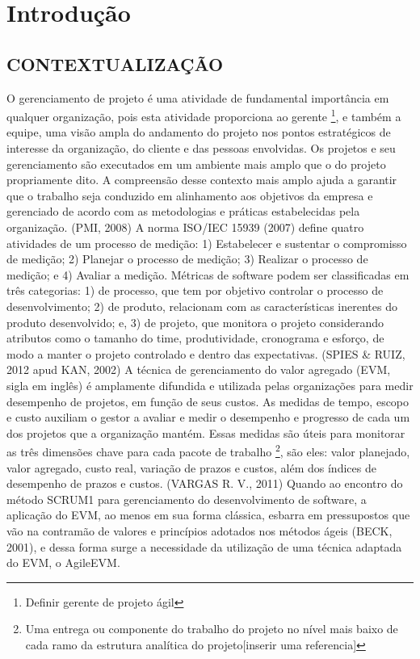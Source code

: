 \chapter[Introdução]{Introdução}


\section{CONTEXTUALIZAÇÃO}
O gerenciamento de projeto é uma atividade de fundamental importância em 
qualquer organização, pois esta atividade proporciona ao gerente 
\footnote{\color{red} Definir gerente de projeto ágil}, e também a equipe, 
uma visão ampla do andamento do projeto nos pontos estratégicos de interesse da 
organização, do cliente e das pessoas envolvidas.
Os projetos e seu gerenciamento são executados em um ambiente mais amplo que o
 do projeto propriamente dito. A compreensão desse contexto mais amplo ajuda a 
garantir que o trabalho seja conduzido em alinhamento aos objetivos da empresa 
e gerenciado de acordo com as metodologias e práticas estabelecidas pela 
organização. (PMI, 2008)
A norma ISO/IEC 15939 (2007) define quatro atividades de um processo de 
medição: 1) Estabelecer e sustentar o compromisso de medição; 2) Planejar o 
processo de medição; 3) Realizar o processo de medição; e 4) Avaliar a medição.
Métricas de software podem ser classificadas em três categorias: 1) de 
processo, que tem por objetivo controlar o processo de desenvolvimento; 
2) de produto, relacionam com as características 
inerentes do produto desenvolvido; e, 3) de projeto, que monitora o projeto 
considerando atributos como o tamanho do time, produtividade, cronograma e 
esforço, de modo a manter o projeto controlado e dentro das expectativas.
(SPIES \& RUIZ, 2012 apud KAN, 2002)
A técnica de gerenciamento do valor agregado (EVM, sigla em inglês) é 
amplamente difundida e utilizada pelas organizações para medir desempenho de
 projetos, em função de seus custos. As medidas de tempo, escopo e custo 
auxiliam o gestor a avaliar e medir o desempenho e progresso de cada um
dos projetos que a organização mantém. Essas medidas são úteis para monitorar 
as três dimensões chave para cada pacote de trabalho \footnote{Uma entrega ou 
componente do trabalho do projeto no nível mais baixo de cada ramo da estrutura analítica do projeto{\color{red}[inserir uma referencia]}}, são eles: valor planejado, valor agregado, custo real, variação de prazos e custos, além dos índices de desempenho de prazos e custos. (VARGAS R. V., 2011)
Quando ao encontro do método SCRUM1 para gerenciamento do desenvolvimento de software, a aplicação do EVM, ao menos em sua forma clássica, esbarra em pressupostos que vão na contramão de valores e princípios adotados nos métodos ágeis (BECK, 2001), e dessa forma surge a necessidade da utilização de uma técnica adaptada do EVM, o AgileEVM.
